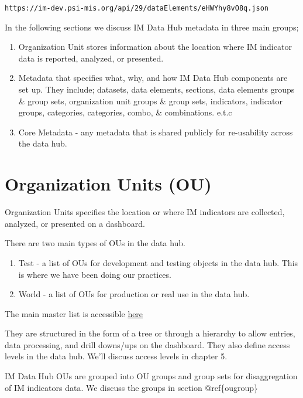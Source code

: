\documentclass[]{book}
\providecommand{\tightlist}{%
  \setlength{\itemsep}{0pt}\setlength{\parskip}{0pt}}
\begin{document}
\texttt{https://im-dev.psi-mis.org/api/29/dataElements/eHWYhy8vO8q.json}

In the following sections we discuss IM Data Hub metadata in three main groups;

\begin{enumerate}
\def\labelenumi{\arabic{enumi}.}
\tightlist
\item
  Organization Unit stores information about the location where IM indicator data is reported, analyzed, or presented.
\item
  Metadata that specifies what, why, and how IM Data Hub components are set up. They include; datasets, data elements, sections, data elements groups \& group sets, organization unit groups \& group sets, indicators, indicator groups, categories, categories, combo, \& combinations. e.t.c
\item
  Core Metadata - any metadata that is shared publicly for re-usability across the data hub.
\end{enumerate}

\hypertarget{organization-units-ou}{%
\section{Organization Units (OU)}\label{organization-units-ou}}

Organization Units specifies the location or where IM indicators are collected, analyzed, or presented on a dashboard.

There are two main types of OUs in the data hub.

\begin{enumerate}
\def\labelenumi{\arabic{enumi}.}
\tightlist
\item
  Test - a list of OUs for development and testing objects in the data hub. This is where we have been doing our practices.
\item
  World - a list of OUs for production or real use in the data hub.
\end{enumerate}

The main master list is accessible \href{\%22https://docs.google.com/spreadsheets/d/1fgdpfbVcn0ywUekA8AuXsnxYpDWGk2Safblyom0EWGo/edit\#gid=40684118\%22}{here}

They are structured in the form of a tree or through a hierarchy to allow entries, data processing, and drill downs/ups on the dashboard. They also define access levels in the data hub. We'll discuss access levels in chapter 5.

IM Data Hub OUs are grouped into OU groups and group sets for disaggregation of IM indicators data. We discuss the groups in section @ref\{ougroup\}
\end{document}
